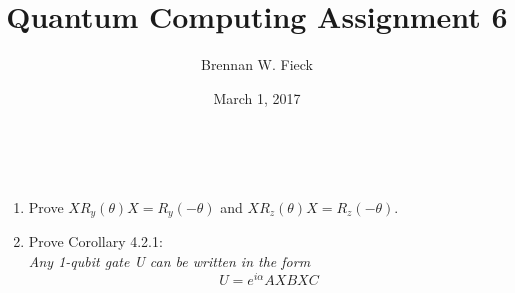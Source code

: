 \documentclass[12pt]{article}
\newenvironment{problem}[2][Problem]{\begin{trivlist}
\item[\hskip \labelsep {\bfseries #1}\hskip \labelsep {\bfseries #2.}]}{\end{trivlist}}
\begin{document}
 
 
\title{Quantum Computing Assignment 6}
\author{Brennan W. Fieck}
\date{March 1, 2017}
\maketitle

\begin{problem}{4.2.3}~\\
\begin{enumerate}[label=(\alph*)]
\item Prove $XR_y(\theta)X=R_y(-\theta)$ and $XR_z(\theta)X=R_z(-\theta)$.
\item Prove Corollary 4.2.1:\\ \emph{Any 1-qubit gate U can be written in
the form
$$U=e^{i\alpha}AXBXC$$}
\end{enumerate}
\end{problem}
\end{document}
